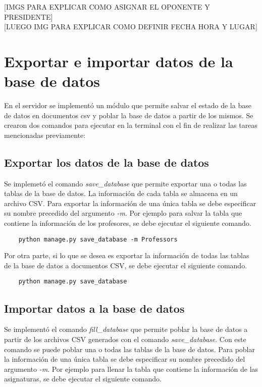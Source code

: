 [IMGS PARA EXPLICAR COMO ASIGNAR EL OPONENTE Y PRESIDENTE] \\

[LUEGO IMG PARA EXPLICAR COMO DEFINIR FECHA HORA Y LUGAR]





\section{Exportar e importar datos de la base de datos}

En el servidor se implementó un módulo 
que permite salvar el estado de la base de datos 
en documentos csv y poblar la base de datos a partir de los mismos.
Se crearon dos comandos para ejecutar en la terminal con el 
fin de realizar las tareas mencionadas previamente:

\subsection{Exportar los datos de la base de datos}

Se implemetó el comando \textit{save\_database}
que permite exportar una o todas las tablas de la base de datos.
La información de cada tabla se almacena en un archivo CSV.
Para exportar la información de una única tabla
se debe especificar su nombre precedido del argumento \textit{-m}. Por 
ejemplo para salvar la tabla que contiene la información de los profesores, se debe 
ejecutar el siguiente comando.

\begin{verbatim}
    python manage.py save_database -m Professors
\end{verbatim}


Por otra parte, si lo que se desea es exportar la información de todas las tablas 
de la base de datos a documentos CSV, se debe ejecutar el siguiente comando.

\begin{verbatim}
    python manage.py save_database
\end{verbatim}


\subsection{Importar datos a la base de datos}
Se implementó el comando \textit{fill\_database} que permite poblar la 
base de datos a partir de los archivos CSV generados con el comando \textit{save\_database}.
Con este comando se puede poblar una o todas las tablas de la base de 
datos. 
Para poblar la información de una única tabla
se debe especificar su nombre precedido del argumento \textit{-m}. Por 
ejemplo para llenar la tabla que contiene la información de las asignaturas, se debe 
ejecutar el siguiente comando.

